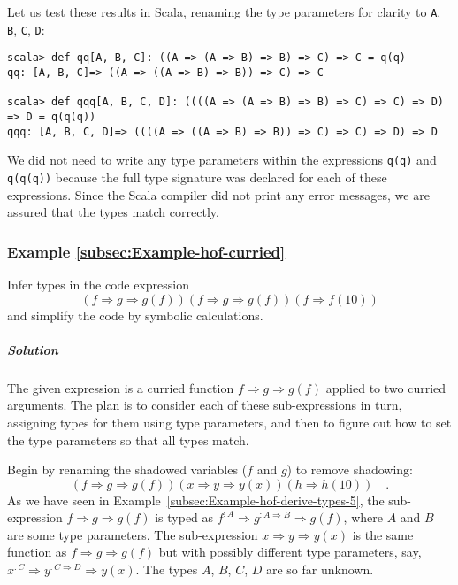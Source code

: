 Let us test these results in Scala, renaming the type parameters for
clarity to \lstinline!A!, \lstinline!B!, \lstinline!C!, \lstinline!D!:
\begin{lstlisting}
scala> def qq[A, B, C]: ((A => (A => B) => B) => C) => C = q(q)
qq: [A, B, C]=> ((A => ((A => B) => B)) => C) => C

scala> def qqq[A, B, C, D]: ((((A => (A => B) => B) => C) => C) => D) => D = q(q(q))
qqq: [A, B, C, D]=> ((((A => ((A => B) => B)) => C) => C) => D) => D
\end{lstlisting}
We did not need to write any type parameters within the expressions
\lstinline!q(q)! and \lstinline!q(q(q))! because the full type signature
was declared for each of these expressions. Since the Scala compiler
did not print any error messages, we are assured that the types match
correctly.

\subsubsection{Example \label{subsec:Example-hof-curried}\ref{subsec:Example-hof-curried}}

Infer types in the code expression
\[
\left(f\Rightarrow g\Rightarrow g(f)\right)\left(f\Rightarrow g\Rightarrow g(f)\right)\left(f\Rightarrow f(10)\right)
\]
and simplify the code by symbolic calculations.

\subparagraph{Solution}

The given expression is a curried function $f\Rightarrow g\Rightarrow g(f)$
applied to two curried arguments. The plan is to consider each of
these sub-expressions in turn, assigning types for them using type
parameters, and then to figure out how to set the type parameters
so that all types match.

Begin by renaming the shadowed variables ($f$ and $g$) to remove
shadowing:
\begin{equation}
\left(f\Rightarrow g\Rightarrow g(f)\right)\left(x\Rightarrow y\Rightarrow y(x)\right)\left(h\Rightarrow h(10)\right)\quad.\label{eq:example-hof-curried-function-solved1}
\end{equation}
 As we have seen in Example~\ref{subsec:Example-hof-derive-types-5},
the sub-expression $f\Rightarrow g\Rightarrow g(f)$ is typed as $f^{:A}\Rightarrow g^{:A\Rightarrow B}\Rightarrow g(f)$,
where $A$ and $B$ are some type parameters. The sub-expression $x\Rightarrow y\Rightarrow y(x)$
is the same function as $f\Rightarrow g\Rightarrow g(f)$ but with
possibly different type parameters, say, $x^{:C}\Rightarrow y^{:C\Rightarrow D}\Rightarrow y(x)$.
The types $A$, $B$, $C$, $D$ are so far unknown.

